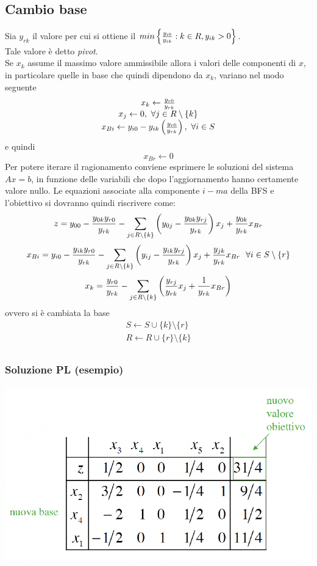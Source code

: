 \documentclass[12pt,a4paper]{article}
\begin{document}
 \subsection{Cambio base}
 Sia $y_{rk}$ il valore per cui si ottiene il $min\left\{{y_{i0} \over y_{ik}}:k\in R, y_{ik}>0\right\}$.\\
 Tale valore è detto \textsl{pivot}.\\
 Se $x_k$ assume il massimo valore ammissibile allora i valori delle componenti di $x$, in particolare quelle in base che quindi dipendono da $x_k$, variano nel modo seguente
 $$\begin{array}{c}
 x_k \leftarrow {y_{r0}\over y_{rk}}\\
 x_j \leftarrow 0, \ \forall j \in R\setminus\{k\}\\
 x_{Bi} \leftarrow y_{i0}-y_{ik}\left({y_{r0}\over y_{rk}}\right), \ \forall i \in S
 \end{array}$$
 e quindi 
 $$x_{Br} \leftarrow 0$$
Per potere iterare il ragionamento conviene esprimere le soluzioni del sistema $Ax=b$, in funzione delle variabili che dopo l’aggiornamento hanno certamente valore nullo. Le equazioni associate alla componente $i-ma$ della BFS e l’obiettivo si dovranno quindi riscrivere come:
$$z=y_{00}-{y_{0k}y_{r0} \over y_{rk}} - \sum_{j\in R \setminus \{k\}}\left(y_{0j}-{y_{0k}y_{rj} \over y_{rk}}\right)x_j + {y_{0k}\over y_{rk}}x_{Br}$$
$$x_{Bi}=y_{i0}-{y_{ik}y_{r0} \over y_{rk}} - \sum_{j\in R \setminus \{k\}}\left(y_{ij}-{y_{ik}y_{rj} \over y_{rk}}\right)x_j + {y_{jk}\over y_{rk}}x_{Br}\ \ \forall i \in S \setminus \{r\}$$
$$x_k={y_{r0} \over y_{rk}} - \sum_{j\in R \setminus \{k\}}\left({y_{rj} \over y_{rk}}x_j + {1\over y_{rk}}x_{Br}\right)$$
ovvero si è cambiata la base
$$\begin{array}{c}
S \leftarrow S \cup\{k\}\setminus\{r\}\\
R \leftarrow R \cup\{r\}\setminus\{k\}\\
\end{array}$$

\subsubsection{Soluzione PL (esempio)}
\begin{center}
\includegraphics[width=0.5\columnwidth]{img/soles_cambiobase.png}
\end{center} 
\end{document}
